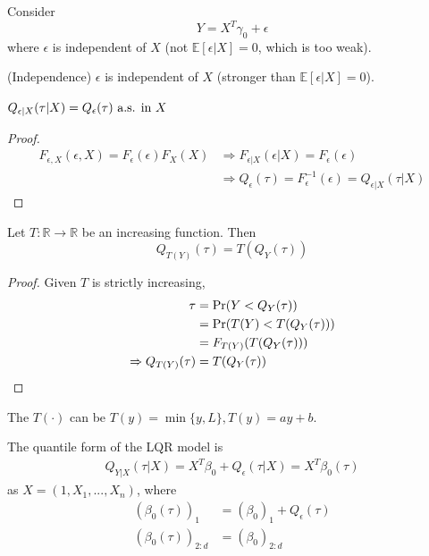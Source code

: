 \documentclass[11pt]{elegantbook}
\begin{document}
Consider $$Y=X^T\gamma_0+\epsilon$$
where $\epsilon$ is independent of $X$ (not $\mathbb{E}[\epsilon|X]=0$, which is too weak).
\begin{assumption} (Independence)
    $\epsilon$ is independent of $X$ (stronger than $\mathbb{E}[\epsilon|X]=0$).
\end{assumption}
\begin{lemma}[By Independence]
    $Q_{\epsilon|X}(\tau|X)=Q_\epsilon(\tau) \textnormal{ a.s. in $X$}$
\end{lemma}
\begin{proof}
    \begin{equation}
        \begin{aligned}
            F_{\epsilon,X}(\epsilon,X)=F_{\epsilon}(\epsilon)F_X(X) &\Rightarrow F_{\epsilon|X}(\epsilon|X)=F_{\epsilon}(\epsilon)\\
            & \Rightarrow Q_{\epsilon}(\tau)=F^{-1}_\epsilon(\epsilon)=Q_{\epsilon|X}(\tau|X)
        \end{aligned}
        \nonumber
    \end{equation}
\end{proof}
\begin{lemma}\label{lemma:equivalence}
    Let $T: \mathbb{R} \rightarrow \mathbb{R}$ be an increasing function. Then $$Q_{T(Y)}(\tau)=T(Q_Y(\tau))$$
\end{lemma}
\begin{proof}
    Given $T$ is strictly increasing,
    \begin{equation}
        \begin{aligned}
            \tau&=\textnormal{Pr}(Y<Q_Y(\tau))\\
            &=\textnormal{Pr}(T(Y)<T(Q_Y(\tau)))\\
            &=F_{T(Y)}(T(Q_Y(\tau)))\\
            \Rightarrow Q_{T(Y)}(\tau)&=T(Q_Y(\tau))
        \end{aligned}
        \nonumber
    \end{equation}
\end{proof}
\begin{example}
    The $T(\cdot)$ can be $T(y)=\min\{y,L\}, T(y)=ay+b$.
\end{example}

The quantile form of the LQR model is
\begin{equation}
    \begin{aligned}
        Q_{Y|X}(\tau|X)=X^T\beta_0+Q_{\epsilon}(\tau|X)=X^T\beta_0(\tau)
    \end{aligned}
    \nonumber
\end{equation}
as $X=(1,X_1,...,X_n)$, where
\begin{equation}
    \begin{aligned}
        (\beta_0(\tau))_1&=(\beta_0)_1+Q_\epsilon(\tau)\\
        (\beta_0(\tau))_{2:d}&=(\beta_0)_{2:d}
    \end{aligned}
    \nonumber
\end{equation}
\end{document}
